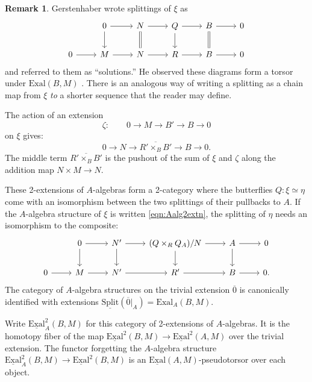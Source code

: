 \documentclass[11pt,reqno]{amsart}
\theoremstyle{definition}
\newtheorem{remark}[theorem]{Remark}
\newcommand{\EExal}{\underline{\textrm{Exal}}}
\newcommand{\Exal}{\textrm{Exal}}
\newcommand{\Split}{\underline{\textrm{Split}}}
\renewcommand{\bar}[1]{\overline{#1}}
\begin{document}

\begin{remark}\label{rmk:gerstenhaberdidit}
Gerstenhaber wrote splittings of $\xi$ as
\[\begin{tikzcd}
 &0 \ar[r] \ar[d] &N \ar[r] \ar[d, equals] &Q \ar[r] \ar[d] &B \ar[r] \ar[d, equals] &0 \\
0 \ar[r] &M \ar[r] &N \ar[r] &R \ar[r] &B \ar[r] &0
\end{tikzcd}\]
and referred to them as ``solutions.'' He observed these diagrams form a torsor under $\Exal(B, M)$ \cite[Theorems 2, 5]{gerstenhaber2}. There is an analogous way of writing a splitting as a chain map from $\xi$ \emph{to} a shorter sequence that the reader may define. 


The action of an extension 
\[\zeta : \qquad 0 \to M \to B' \to B \to 0\]
on $\xi$ gives:
\[0 \to N \to \bar{R' \times_B B'} \to B \to 0.\]
The middle term $\bar{R' \times_B B'}$ is the pushout of the sum of $\xi$ and $\zeta$ along the addition map $N \times M \to N$. 
\end{remark}

These 2-extensions of $A$-algebras form a 2-category where the butterflies $Q : \xi \simeq \eta$ come with an isomorphism between the two splittings of their pullbacks to $A$. If the $A$-algebra structure of $\xi$ is written \eqref{eqn:Aalg2extn}, the splitting of $\eta$ needs an isomorphism to the composite:
\[\begin{tikzcd}
 &0 \ar[r] \ar[d] &N' \ar[r] \ar[d] &(Q \times_R Q_A)/N \ar[r] \ar[d] &A \ar[r] \ar[d] &0 \\
0 \ar[r] &M \ar[r] &N' \ar[r] &R' \ar[r] &B \ar[r] &0.
\end{tikzcd}\]
The category of $A$-algebra structures on the trivial extension $\bar 0$ is canonically identified with extensions $\Split(\bar 0|_A) = \Exal_A(B, M)$. 


Write $\EExal^2_A(B, M)$ for this category of 2-extensions of $A$-algebras. It is the homotopy fiber of the map $\EExal^2(B, M) \to \EExal^2(A, M)$ over the trivial extension. The functor forgetting the $A$-algebra structure $\EExal^2_A(B, M) \to \EExal^2(B, M)$ is an $\EExal(A, M)$-pseudotorsor over each object. 
\end{document}
